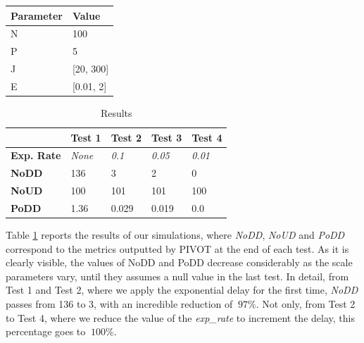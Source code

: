 \vspace{3mm}
\begin{table}[H]
\centering
\begin{tabular}{|l|l|}
\hline
\multicolumn{1}{|c|}{\textbf{Parameter}} & \textbf{Value} \\ \hline
N                                        & 100            \\ \hline
P                                        & 5              \\ \hline
J                                     & [20, 300]             \\ \hline
E                                     & [0.01, 2]           \\ \hline
\end{tabular}
\end{table}
\vspace{3mm}

\vspace{3mm}
\begin{table}[H]
\centering
\begin{tabular}{l|l|l|l|l|}
\cline{2-5}
\multicolumn{1}{c|}{\textbf{}}                                & \textbf{Test 1} & \textbf{Test 2} & \textbf{Test 3} & \textbf{Test 4} \\ \hline
\multicolumn{1}{|l|}{\textbf{Exp. Rate}}                      & \textit{None}            & \textit{0.1}             & \textit{0.05}            & \textit{0.01}            \\ \hline \hline
\multicolumn{1}{|l|}{\textbf{NoDD}}     & 136             & 3               & 2               & 0               \\ \hline
\multicolumn{1}{|l|}{\textbf{NoUD}}        & 100             & 101             & 101             & 100             \\ \hline
\multicolumn{1}{|l|}{\textbf{PoDD}} & 1.36            & 0.029           & 0.019           & 0.0             \\ \hline
\end{tabular}
\vspace{2mm}
\caption{Results}
\label{tab:countermeasures_results}
\end{table}
\vspace{3mm}

Table \ref{tab:countermeasures_results} reports the results of our simulations, where \textit{NoDD}, \textit{NoUD} and \textit{PoDD} correspond to the metrics outputted by PIVOT at the end of each test. As it is clearly visible, the values of NoDD and PoDD decrease considerably as the scale parameters vary, until they assumes a null value in the last test. In detail, from Test 1 and Test 2, where we apply the exponential delay for the first time, \textit{NoDD} passes from 136 to 3, with an incredible reduction of \(\ 97\% \). Not only, from Test 2 to Test 4, where we reduce the value of the \textit{exp\_rate} to increment the delay, this percentage goes to \(\ 100\% \). 